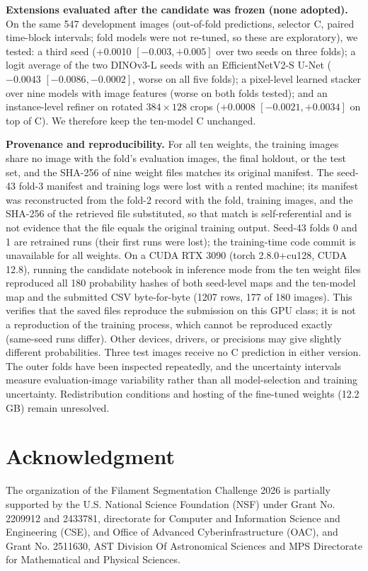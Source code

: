\documentclass[sigconf]{acmart}
\begin{document}
\textbf{Extensions evaluated after the candidate was frozen (none adopted).} On the same 547 development images (out-of-fold predictions, selector C, paired time-block intervals; fold models were not re-tuned, so these are exploratory), we tested: a third seed (+0.0010 $[-0.003,+0.005]$ over two seeds on three folds); a logit average of the two DINOv3-L seeds with an EfficientNetV2-S U-Net ($-0.0043$ $[-0.0086,-0.0002]$, worse on all five folds); a pixel-level learned stacker over nine models with image features (worse on both folds tested); and an instance-level refiner on rotated $384\times128$ crops ($+0.0008$ $[-0.0021,+0.0034]$ on top of C). We therefore keep the ten-model C unchanged.

\textbf{Provenance and reproducibility.} For all ten weights, the training images share no image with the fold's evaluation images, the final holdout, or the test set, and the SHA-256 of nine weight files matches its original manifest. The seed-43 fold-3 manifest and training logs were lost with a rented machine; its manifest was reconstructed from the fold-2 record with the fold, training images, and the SHA-256 of the retrieved file substituted, so that match is self-referential and is not evidence that the file equals the original training output. Seed-43 folds 0 and 1 are retrained runs (their first runs were lost); the training-time code commit is unavailable for all weights. On a CUDA RTX 3090 (torch 2.8.0+cu128, CUDA 12.8), running the candidate notebook in inference mode from the ten weight files reproduced all 180 probability hashes of both seed-level maps and the ten-model map and the submitted CSV byte-for-byte (1207 rows, 177 of 180 images). This verifies that the saved files reproduce the submission on this GPU class; it is not a reproduction of the training process, which cannot be reproduced exactly (same-seed runs differ). Other devices, drivers, or precisions may give slightly different probabilities. Three test images receive no C prediction in either version. The outer folds have been inspected repeatedly, and the uncertainty intervals measure evaluation-image variability rather than all model-selection and training uncertainty. Redistribution conditions and hosting of the fine-tuned weights (12.2 GB) remain unresolved.
\section{Acknowledgment}\label{sec:acknowledgment}
    The organization of the Filament Segmentation Challenge 2026 is partially supported by the U.S. National Science Foundation (NSF) under Grant No. 2209912 and 2433781, directorate for Computer and Information Science and Engineering (CSE), and Office of Advanced Cyberinfrastructure (OAC), and Grant No. 2511630, AST Division Of Astronomical Sciences and MPS Directorate for Mathematical and Physical Sciences.
\end{document}
